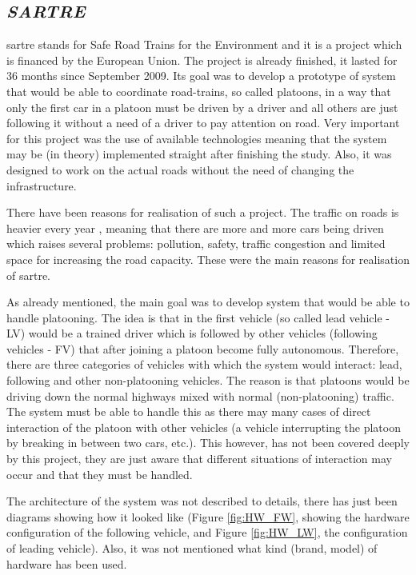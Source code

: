 \subsection{\textit{SARTRE}}\label{sec:SARTRE}

\acrshort{sartre} \cite{Chan2012ProjectSARTRE} stands for Safe Road Trains for the Environment and it is a project which is financed by the European Union. The project is already finished, it lasted for 36 months since September 2009. Its goal was to develop a prototype of system that would be able to coordinate road-trains, so called platoons, in a way that only the first car in a platoon must be driven by a driver and all others are just following it without a need of a driver to pay attention on road. Very important for this project was the use of available technologies meaning that the system may be (in theory) implemented straight after finishing the study. Also, it was designed to work on the actual roads without the need of changing the infrastructure.\par
% 
There have been reasons for realisation of such a project. The traffic on roads is heavier every year \cite{Tencer2011NumberWheels}, meaning that there are more and more cars being driven which raises several problems: pollution, safety, traffic congestion and limited space for increasing the road capacity. These were the main reasons for realisation of \acrshort{sartre}. \par
% 
As already mentioned, the main goal was to develop system that would be able to handle platooning. The idea is that in the first vehicle (so called lead vehicle - LV) would be a trained driver which is followed by other vehicles (following vehicles - FV) that after joining a platoon become fully autonomous. Therefore, there are three categories of vehicles with which the system would interact: lead, following and other non-platooning vehicles. The reason is that platoons would be driving down the normal highways mixed with normal (non-platooning) traffic. The system must be able to handle this as there may many cases of direct interaction of the platoon with other vehicles (a vehicle interrupting the platoon by breaking in between two cars, etc.). This however, has not been covered deeply by this project, they are just aware that different situations of interaction may occur and that they must be handled.\par
% 
The architecture of the system was not described to details, there has just been diagrams showing how it looked like (Figure \ref{fig:HW_FW}, showing the hardware configuration of the following vehicle, and Figure \ref{fig:HW_LW}, the configuration of leading vehicle). Also, it was not mentioned what kind (brand, model) of hardware has been used.\par
